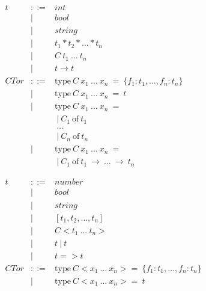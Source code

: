 \documentclass[12pt]{matmex-diploma}
\newcommand \bnfdef  {\mathrel{::=}}
\newcommand \bnfalt  {\mathrel{{|}}}
\begin{document}
\clearpage

\begin{center}
$
\begin{array}{lll}
t & \bnfdef & int  \\
  & \bnfalt & bool \\
  & \bnfalt & string \\
  & \bnfalt & t_1 * t_2 * \ldots * t_n \\
  & \bnfalt & C ~ t_1 ~ \ldots ~ t_n \\
  & \bnfalt & t \to t \\[1ex]
  
CTor & \bnfdef & \mbox{type}~C~x_1~\ldots ~x_n~=~ \{f_1:t_1, \ldots, f_n:t_n\} \\ 
  & \bnfalt & \mbox{type}~C~x_1~\ldots ~x_n~=~ t \\
  & \bnfalt & \mbox{type}~C~x_1~\ldots ~x_n~=~ \\
  & & ~|~C_1~\mbox{of}~t_1 \\ 
  & & ~\ldots \\
  & & ~|~C_n~\mbox{of}~t_n \\
  & \bnfalt & \mbox{type}~C~x_1~\ldots ~x_n~=~ \\
  & & ~|~C_1~\mbox{of}~t_1~\to~\ldots~\to~t_n
\end{array}
$
\captionsetup{type=lstlisting}
\label{tbl:syntaxml_types}
\end{center}

\begin{center}
$
\begin{array}{lll}
t & \bnfdef & number  \\
  & \bnfalt & bool \\
  & \bnfalt & string \\
  & \bnfalt & [t_1, t_2, \ldots, t_n] \\
  & \bnfalt & C<t_1 ~ \ldots ~ t_n> \\
  & \bnfalt & t~|~t \\
  & \bnfalt & t => t \\[1ex]
  
CTor & \bnfdef & \mbox{type}~C<x_1~\ldots ~x_n>=~ \{f_1:t_1, \ldots, f_n:t_n\} \\ 
  & \bnfalt & \mbox{type}~C<x_1~\ldots ~x_n>=~ t \\
\end{array}
$
\captionsetup{type=lstlisting}
\label{tbl:syntaxjs_types}
\end{center}
\end{document}
